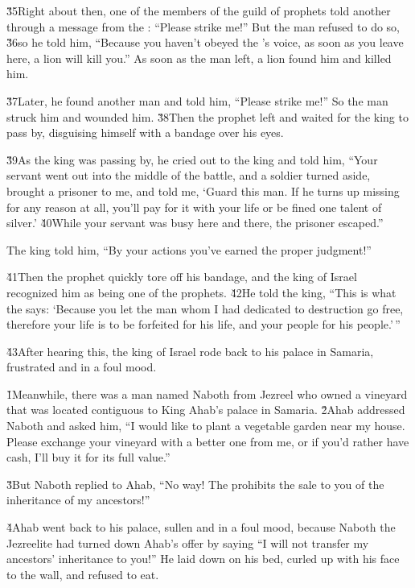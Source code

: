 \v{35}Right about then, one of the members of the guild of prophets told another through a message from the : ``Please strike me!'' But the man refused to do so, \v{36}so he told him, ``Because you haven't obeyed the 's voice, as soon as you leave here, a lion will kill you.'' As soon as the man left, a lion found him and killed him.

\v{37}Later, he found another man and told him, ``Please strike me!'' So the man struck him and wounded him. \v{38}Then the prophet left and waited for the king to pass by, disguising himself with a bandage over his eyes.

\v{39}As the king was passing by, he cried out to the king and told him, ``Your servant went out into the middle of the battle, and a soldier turned aside, brought a prisoner to me, and told me, `Guard this man. If he turns up missing for any reason at all, you'll pay for it with your life or be fined one talent of silver.' \v{40}While your servant was busy here and there, the prisoner escaped.''

The king told him, ``By your actions you've earned the proper judgment!''

\v{41}Then the prophet quickly tore off his bandage, and the king of Israel recognized him as being one of the prophets. \v{42}He told the king, ``This is what the  says: `Because you let the man whom I had dedicated to destruction go free, therefore your life is to be forfeited for his life, and your people for his people.'\,''

\v{43}After hearing this, the king of Israel rode back to his palace in Samaria, frustrated and in a foul mood.

\v{1}Meanwhile, there was a man named Naboth from Jezreel who owned a vineyard that was located contiguous to King Ahab's palace in Samaria. \v{2}Ahab addressed Naboth and asked him, ``I would like to plant a vegetable garden near my house. Please exchange your vineyard with a better one from me, or if you'd rather have cash, I'll buy it for its full value.''

\v{3}But Naboth replied to Ahab, ``No way! The  prohibits the sale to you of the inheritance of my ancestors!''

\v{4}Ahab went back to his palace, sullen and in a foul mood, because Naboth the Jezreelite had turned down Ahab's offer by saying ``I will not transfer my ancestors' inheritance to you!'' He laid down on his bed, curled up with his face to the wall, and refused to eat.

